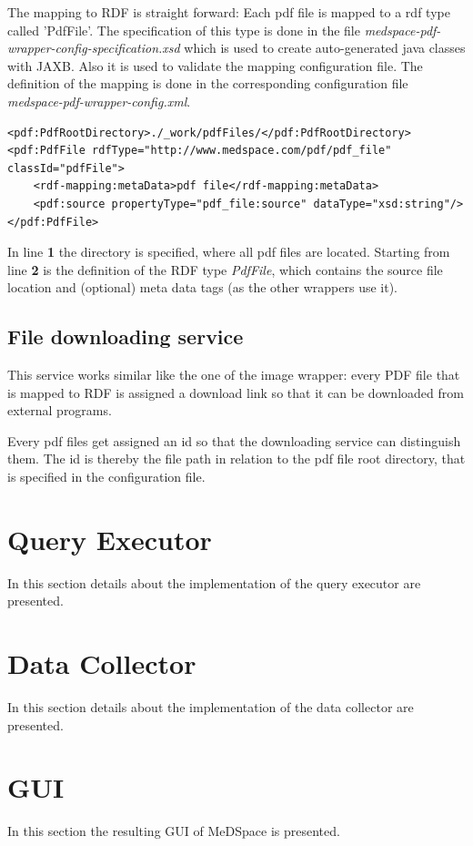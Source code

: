 The mapping to RDF is straight forward: Each pdf file is mapped to a rdf type called 'PdfFile'. The specification of this type is done in the file \emph{medspace-pdf-wrapper-config-specification.xsd} which is used to create auto-generated java classes with JAXB. Also it is used to validate the mapping configuration file. The definition of the mapping is done in the corresponding configuration file \emph{medspace-pdf-wrapper-config.xml}.

\begin{lstlisting}[style=RdfCodeStyle, caption=Extract of the pdf wrapper configuration, label=PDFWrapperMappingConfig]
<pdf:PdfRootDirectory>./_work/pdfFiles/</pdf:PdfRootDirectory>
<pdf:PdfFile rdfType="http://www.medspace.com/pdf/pdf_file" classId="pdfFile">
	<rdf-mapping:metaData>pdf file</rdf-mapping:metaData>
    <pdf:source propertyType="pdf_file:source" dataType="xsd:string"/>
</pdf:PdfFile>
\end{lstlisting}

In line \textbf{1} the directory is specified, where all pdf files are located.
Starting from line \textbf{2} is the definition of the RDF type \emph{PdfFile}, which contains the source file location and (optional) meta data tags (as the other wrappers use it).

\subsection{File downloading service}

This service works similar like the one of the image wrapper: every PDF file that is mapped to RDF is assigned a download link so that it can be downloaded from external programs.

Every pdf files get assigned an id so that the downloading service can distinguish them. The id is thereby the file path in relation to the pdf file root directory, that is specified in the configuration file.

\section{Query Executor}
In this section details about the implementation of the query executor are presented. 

\section{Data Collector}
In this section details about the implementation of the data collector are presented.

\section{GUI}
In this section the resulting GUI of MeDSpace is presented.
